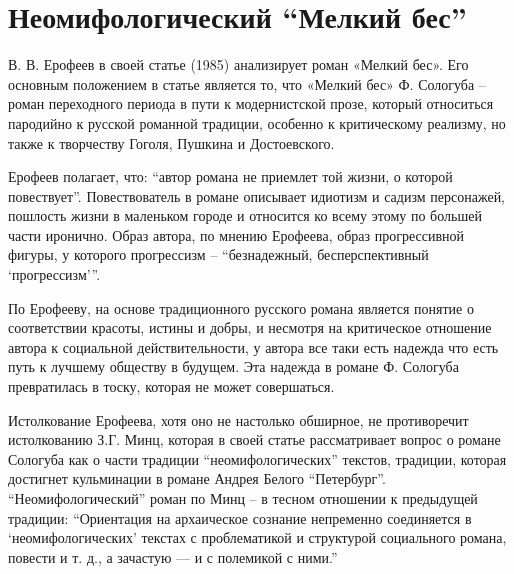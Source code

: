 \documentclass[12pt,a4paper]{article}
\begin{document}
\section{Неомифологический \enquote{Мелкий бес}}

В. В. Ерофеев в своей статье  (1985) анализирует роман «Мелкий бес». Его основным положением в статье является то, что «Мелкий бес» Ф. Сологуба -- роман переходного периода в пути к модернистской прозе, который относиться пародийно к русской романной традиции, особенно к критическому реализму, но также к творчеству Гоголя, Пушкина и Достоевского. \parencite[145.]{jerofeev1985}

Ерофеев полагает, что: \enquote{автор романа не приемлет той жизни, о которой повествует}. Повествователь в романе описывает идиотизм и садизм персонажей, пошлость жизни в маленьком городе и относится ко всему этому по большей части иронично. Образ автора, по мнению Ерофеева, образ прогрессивной фигуры, у которого прогрессизм -- \enquote{безнадежный, бесперспективный \enquote{прогрессизм}}. \parencite[146.]{jerofeev1985}

По Ерофееву, на основе традиционного русского романа является понятие о соответствии красоты, истины и добры, и несмотря на критическое отношение автора к социальной действительности, у автора все таки есть надежда что есть путь к лучшему обществу в будущем. Эта надежда в романе Ф. Сологуба превратилась в тоску, которая не может совершаться.  \parencite[158.]{jerofeev1985}


Истолкование Ерофеева, хотя оно не настолько обширное, не противоречит истолкованию З.Г. Минц, которая в  своей статье  \parencite*{mints2004} рассматривает вопрос о романе Сологуба как о части традиции \enquote{неомифологических} текстов, традиции, которая достигнет кульминации в романе Андрея Белого \enquote{Петербург}. \enquote{Неомифологический} роман по Минц -- в тесном отношении к предыдущей традиции: \enquote{Ориентация на архаическое сознание непременно соединяется в \enquote{неомифологических} текстах с проблематикой и структурой социального романа, повести и т. д., а зачастую — и с полемикой с ними.} \parencite[60.]{mints2004} 
\end{document}

